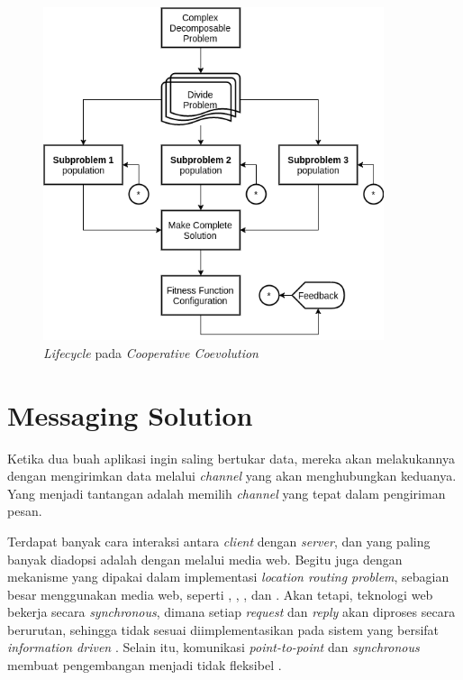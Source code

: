 \begin{figure}[h]
	\centering
	\includegraphics[width=10cm]{Resources/Images/coes_overview}
	\caption{\textit{Lifecycle} pada \textit{Cooperative Coevolution} \citep{de_oliveira_cooperative_2016}}
	\label{fig:coes_lifecycle}
\end{figure}


\section{Messaging Solution}
\label{sec:messaging-solution}


Ketika dua buah aplikasi ingin saling bertukar data, mereka akan melakukannya dengan mengirimkan data melalui \textit{channel} yang akan menghubungkan keduanya. Yang menjadi tantangan adalah memilih \textit{channel} yang tepat dalam pengiriman pesan.


Terdapat banyak cara interaksi antara \textit{client} dengan \textit{server}, dan yang paling banyak diadopsi adalah dengan melalui media web. Begitu juga dengan mekanisme yang dipakai dalam implementasi \textit{location routing problem}, sebagian besar menggunakan media web, seperti \citep{weise_solving_2009}, \citep{sengoku_fast_1998}, \citep{sarmenta_bayanihan_2002}, dan \citep{diaz_vrp_2012}. Akan tetapi, teknologi web bekerja secara \textit{synchronous}, dimana setiap \textit{request} dan \textit{reply} akan diproses secara berurutan, sehingga tidak sesuai diimplementasikan pada sistem yang bersifat \textit{information driven} \citep{muhl_large-scale_2002}. Selain itu, komunikasi \textit{point-to-point} dan \textit{synchronous} membuat pengembangan menjadi tidak fleksibel \citep{eugster_many_2003}.


